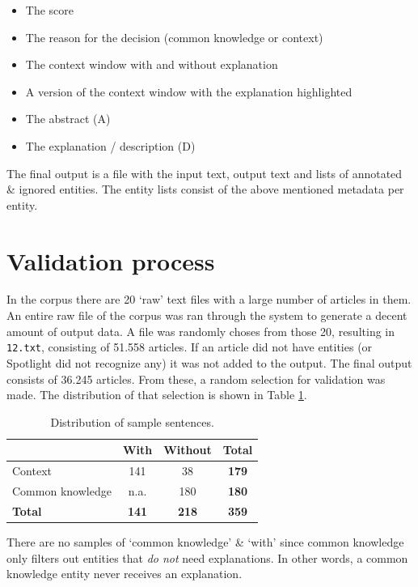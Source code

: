 \documentclass[
10pt, %
a4paper, %
oneside, %
headinclude,footinclude, %
] {book}%
\begin{document}
\begin{itemize}
  \item The score
  \item The reason for the decision (common knowledge or context)
  \item The context window with and without explanation
  \item A version of the context window with the explanation highlighted
  \item The abstract (A)
  \item The explanation / description (D)
\end{itemize}

The final output is a file with the input text, output text and lists of annotated \& ignored entities.
The entity lists consist of the above mentioned metadata per entity.

\section{Validation process}
In the corpus there are 20 `raw' text files with a large number of articles in them.
An entire raw file of the corpus was ran through the system to generate a decent amount of output data.
A file was randomly choses from those 20, resulting in \verb+12.txt+, consisting of 51.558 articles.
If an article did not have entities (or Spotlight did not recognize any) it was not added to the output.
The final output consists of 36.245 articles.
From these, a random selection for validation was made.
The distribution of that selection is shown in Table \ref{table:sample}.

\begin{table}[hbtp]\centering
  \caption{Distribution of sample sentences.\label{table:sample}}
  \begin{tabular}{l|ccc}
                     & With         & Without      & \textbf{Total} \\
    \hline
    Context          & 141          & 38           & \textbf{179}   \\
    Common knowledge & n.a.         & 180          & \textbf{180}   \\
    \textbf{Total}   & \textbf{141} & \textbf{218} & \textbf{359}   \\
  \end{tabular}
\end{table}

There are no samples of `common knowledge' \& `with' since common knowledge only filters out entities that \textit{do not} need explanations.
In other words, a common knowledge entity never receives an explanation.
\end{document}
